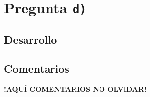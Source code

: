 \section{Pregunta \texttt{d)}}\label{pregunta-d}

\subsection{Desarrollo}




\FloatBarrier
\subsection{Comentarios}


\textbf{!AQUÍ COMENTARIOS NO OLVIDAR!}